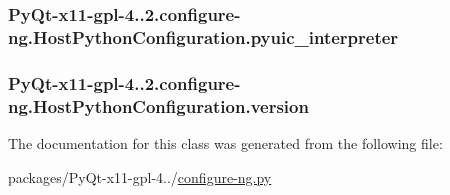 \subsubsection[{pyuic\+\_\+interpreter}]{\setlength{\rightskip}{0pt plus 5cm}Py\+Qt-\/x11-\/gpl-\/4..\+2.configure-\/ng.\+Host\+Python\+Configuration.\+pyuic\+\_\+interpreter}\label{classPyQt-x11-gpl-4_811_82_1_1configure-ng_1_1HostPythonConfiguration_a7fe086568ca3b57ff2bd2d71c424d561}
\hypertarget{classPyQt-x11-gpl-4_811_82_1_1configure-ng_1_1HostPythonConfiguration_a9c2bce4e381b03ad1860d19197fabcd7}{}
\subsubsection[{version}]{\setlength{\rightskip}{0pt plus 5cm}Py\+Qt-\/x11-\/gpl-\/4..\+2.configure-\/ng.\+Host\+Python\+Configuration.\+version}\label{classPyQt-x11-gpl-4_811_82_1_1configure-ng_1_1HostPythonConfiguration_a9c2bce4e381b03ad1860d19197fabcd7}


The documentation for this class was generated from the following file\+:\begin{DoxyCompactItemize}
\item 
packages/\+Py\+Qt-\/x11-\/gpl-\/4../\hyperlink{configure-ng_8py}{configure-\/ng.\+py}\end{DoxyCompactItemize}
